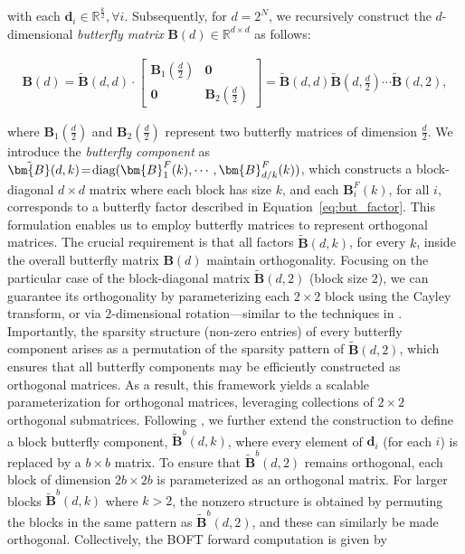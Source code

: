 with each $\bm{d}_i\in\mathbb{R}^{\frac{k}{2}},\forall i$. Subsequently, for $d=2^N$, we recursively construct the $d$-dimensional \emph{butterfly matrix} $\bm{B}(d)\in\mathbb{R}^{d\times d}$ as follows:

\begin{equation}
\begin{aligned}
    \!\!\bm{B}(d)=\tilde{\bm{B}}(d,d)\!\cdot\!\begin{bmatrix}
    \bm{B}_1(\frac{d}{2})\!\!\!\!\! & \bm{0} \\
    \bm{0}\!\!\!\!\! &\bm{B}_2(\frac{d}{2})
    \end{bmatrix}= \tilde{\bm{B}}(d,d)\tilde{\bm{B}}(d,\frac{d}{2})\cdots\tilde{\bm{B}}(d,2),
\end{aligned}
\end{equation}

where $\bm{B}_1(\frac{d}{2})$ and $\bm{B}_2(\frac{d}{2})$ represent two butterfly matrices of dimension $\frac{d}{2}$. We introduce the \emph{butterfly component} as $\thickmuskip=2mu \medmuskip=2mu \tilde{\bm{B}}(d,k)=\text{diag}(\bm{B}^F_1(k),\cdots,\bm{B}^F_{d/k}(k))$, which constructs a block-diagonal $d\times d$ matrix where each block has size $k$, and each $\bm{B}^F_i(k)$, for all $i$, corresponds to a butterfly factor described in Equation~\ref{eq:but_factor}. This formulation enables us to employ butterfly matrices to represent orthogonal matrices. The crucial requirement is that all factors $\tilde{\bm{B}}(d,k)$, for every $k$, inside the overall butterfly matrix $\bm{B}(d)$ maintain orthogonality. Focusing on the particular case of the block-diagonal matrix $\tilde{\bm{B}}(d,2)$ (block size $2$), we can guarantee its orthogonality by parameterizing each $2\times 2$ block using the Cayley transform, or via $2$-dimensional rotation—similar to the techniques in \cite{liu2021orthogonal,qiu2023controlling}. Importantly, the sparsity structure (non-zero entries) of every butterfly component arises as a permutation of the sparsity pattern of $\tilde{\bm{B}}(d,2)$, which ensures that all butterfly components may be efficiently constructed as orthogonal matrices. As a result, this framework yields a scalable parameterization for orthogonal matrices, leveraging collections of $2\times 2$ orthogonal submatrices. Following \cite{chen2022pixelated}, we further extend the construction to define a block butterfly component, $\tilde{\bm{B}}^b(d,k)$, where every element of $\bm{d}_i$ (for each $i$) is replaced by a $b\times b$ matrix. To ensure that $\tilde{\bm{B}}^b(d,2)$ remains orthogonal, each block of dimension $2b\times 2b$ is parameterized as an orthogonal matrix. For larger blocks $\tilde{\bm{B}}^b(d,k)$ where $k>2$, the nonzero structure is obtained by permuting the blocks in the same pattern as $\tilde{\bm{B}}^b(d,2)$, and these can similarly be made orthogonal. Collectively, the BOFT forward computation is given by

